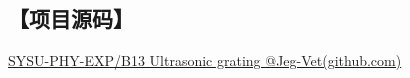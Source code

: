 \documentclass[12pt,a4paper,UTF8]{ctexart}
\begin{document}
\subsection*{【项目源码】}
\href{https://github.com/Jeg-Vet/SYSU-PHY-EXP/tree/main/B13-Ultrasonic_grating}{SYSU-PHY-EXP/B13 Ultrasonic grating @Jeg-Vet(github.com)}
\end{document}

